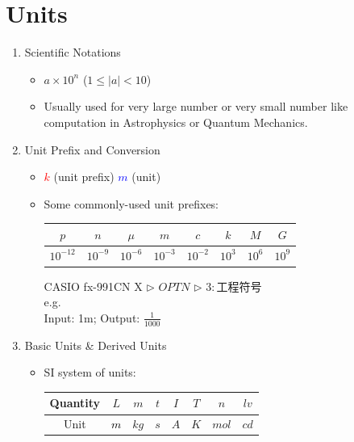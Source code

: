 \documentclass{beamer}
\begin{document}
\section{Units}
\begin{frame}
  \begin{enumerate}[1.]
    \item Scientific Notations
    \begin{itemize}
      \item $ a\times 10^n$ ($1\leq |a| < 10$)
      \item Usually used for very large number or very small number like computation in Astrophysics or Quantum Mechanics.
    \end{itemize}
    \item Unit Prefix and Conversion
    \begin{itemize}
      \item \textcolor{red}{$k$} (unit prefix) \textcolor{blue}{$m$} (unit)
      \item Some commonly-used unit prefixes:\\ 
      \begin{table}[H]
        \begin{tabular}{c|c|c|c|c|c|c|c}
        \hline
        $p$        & $n$       & $\mu$     & $m$       & $c$       & $k$      & $M$      & $G$      \\ \hline
        $10^{-12}$ & $10^{-9}$ & $10^{-6}$ & $10^{-3}$ & $10^{-2}$ & $10^{3}$ & $10^{6}$ & $10^{9}$ \\ \hline
        \end{tabular}
        \end{table}
        
        CASIO fx-991CN X $\rhd$ $\boxed{OPTN}$ $\rhd$ $3:$工程符号\\
        e.g.\\Input: 1m; Output: $\frac{1}{1000}$
    \end{itemize}
    \item Basic Units \& Derived Units
    \begin{itemize}
      \item SI system of units: 
      \begin{table}[H]
        \begin{tabular}{c|c|c|c|c|c|c|c}
        \hline
        Quantity & $L$        & $m$       & $t$       & $I$       & $T$       & $n$      & $lv$     \\ \hline
        Unit     & \textcolor{black}{$m$} & $kg$& $s$ & $A$ & $K$ & $mol$ & $cd$ \\ \hline
        \end{tabular}
        \end{table}
    \end{itemize}
  \end{enumerate}
\end{frame}
\end{document}
